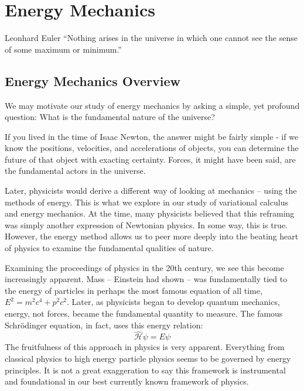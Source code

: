 
\part{Energy Mechanics}\label{part: energy mech}
\pagestyle{fancy}

\begin{chapquote}{Leonhard Euler}
    ``Nothing arises in the universe in which one cannot see the sense of some maximum or minimum.''
\end{chapquote}


\chapter*{Energy Mechanics Overview}

We may motivate our study of energy mechanics by asking a simple, yet profound question:
What is the fundamental nature of the universe?

If you lived in the time of Isaac Newton, the answer might be fairly simple - if we know the positions, velocities, and accelerations of objects, you can determine the future of that object with exacting certainty. Forces, it might have been said, are the fundamental actors in the universe.

Later, physicists would derive a different way of looking at mechanics -- using the methods of energy. This is what we explore in our study of variational calculus and energy mechanics. At the time, many physicists believed that this reframing was simply another expression of Newtonian physics. In some way, this is true. However, the energy method allows us to peer more deeply into the beating heart of physics to examine the fundamental qualities of nature. 

Examining the proceedings of physics in the 20th century, we see this become increasingly apparent. Mass -- Einstein had shown -- was fundamentally tied to the energy of particles in perhaps the most famous equation of all time, $E^2=m^2c^4+p^2c^2$. Later, as physicists began to develop quantum mechanics, energy, not forces, became the fundamental quantity to measure. The famous Schr\"odinger equation, in fact, uses this energy relation:
$$\hat{\mathcal{H}}\psi=E\psi$$
The fruitfulness of this approach in physics is very apparent. Everything from classical physics to high energy particle physics seems to be governed by energy principles. It is not a great exaggeration to say this framework is instrumental and foundational in our best currently known framework of physics.

